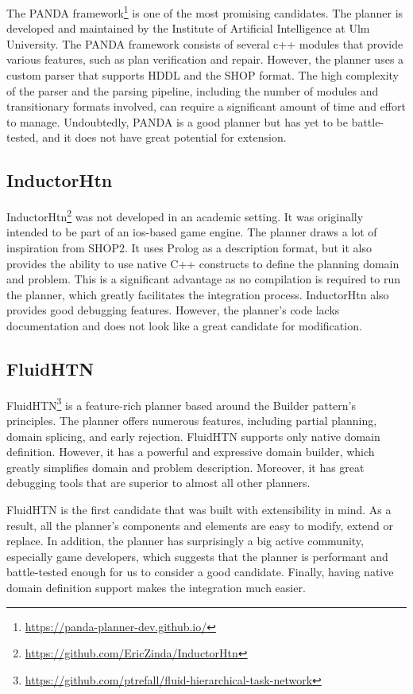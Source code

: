 The PANDA framework\footnote{\url{https://panda-planner-dev.github.io/}} is one of the most promising candidates. The planner is developed and maintained by the Institute of Artificial Intelligence at Ulm University. The PANDA framework consists of several c++ modules that provide various features, such as plan verification and repair. However, the planner uses a custom parser that supports HDDL and the SHOP format. The high complexity of the parser and the parsing pipeline, including the number of modules and transitionary formats involved, can require a significant amount of time and effort to manage. Undoubtedly, PANDA is a good planner but has yet to be battle-tested, and it does not have great potential for extension.



\subsection*{InductorHtn}

InductorHtn\footnote{\url{https://github.com/EricZinda/InductorHtn}} was not developed in an academic setting. It was originally intended to be part of an ios-based game engine. The planner draws a lot of inspiration from SHOP2. It uses Prolog as a description format, but it also provides the ability to use native C++ constructs to define the planning domain and problem. This is a significant advantage as no compilation is required to run the planner, which greatly facilitates the integration process. InductorHtn also provides good debugging features. However, the planner's code lacks documentation and does not look like a great candidate for modification.


\subsection*{FluidHTN}

FluidHTN\footnote{\url{https://github.com/ptrefall/fluid-hierarchical-task-network}} is a feature-rich planner based around the Builder pattern's principles. The planner offers numerous features, including partial planning, domain splicing, and early rejection. FluidHTN supports only native domain definition. However, it has a powerful and expressive domain builder, which greatly simplifies domain and problem description. Moreover, it has great debugging tools that are superior to almost all other planners.

FluidHTN is the first candidate that was built with extensibility in mind. As a result, all the planner's components and elements are easy to modify, extend or replace. In addition, the planner has surprisingly a big active community, especially game developers, which suggests that the planner is performant and battle-tested enough for us to consider a good candidate. Finally, having native domain definition support makes the integration much easier. 


